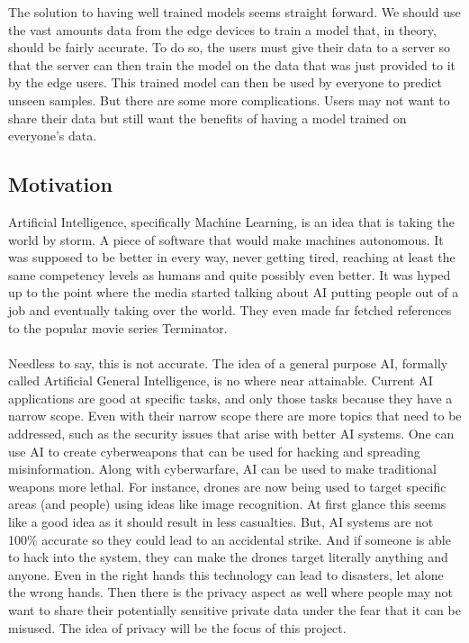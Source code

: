 \documentclass[12pt]{article}
\begin{document}
\noindent The solution to having well trained models seems straight forward. We should use the vast amounts data from the edge devices to train a model that, in theory, should be fairly accurate. To do so, the users must give their data to a server so that the server can then train the model on the data that was just provided to it by the edge users. This trained model can then be used by everyone to predict unseen samples. But there are some more complications. Users may not want to share their data but still want the benefits of having a model trained on everyone's data. 
\subsection{Motivation}
Artificial Intelligence, specifically Machine Learning, is an idea that is taking the world by storm. A piece of software that would make machines autonomous. It was supposed to be better in every way, never getting tired, reaching at least the same competency levels as humans and quite possibly even better. It was hyped up to the point where the media started talking about AI putting people out of a job and eventually taking over the world. They even made far fetched references to the popular movie series Terminator.
\\\\
Needless to say, this is not accurate. The idea of a general purpose AI, formally called Artificial General Intelligence, is no where near attainable. Current AI applications are good at specific tasks, and only those tasks because they have a narrow scope. Even with their narrow scope there are more topics that need to be addressed, such as the security issues that arise with better AI systems. One can use AI to create cyberweapons that can be used for hacking and spreading misinformation. Along with cyberwarfare, AI can be used to make traditional weapons more lethal. For instance, drones are now being used to target specific areas (and people) using ideas like image recognition. At first glance this seems like a good idea as it should result in less casualties. But, AI systems are not 100\% accurate so they could lead to an accidental strike. And if someone is able to hack into the system, they can make the drones target literally anything and anyone. Even in the right hands this technology can lead to disasters, let alone the wrong hands. Then there is the privacy aspect as well where people may not want to share their potentially sensitive private data under the fear that it can be misused. The idea of privacy will be the focus of this project.
\end{document}
